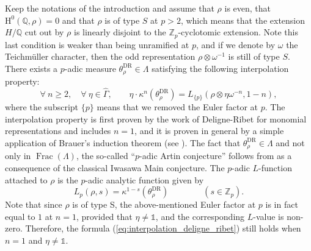 \documentclass[12pt]{amsart}
\newcommand\bQ{\mathbb{Q}}
\newcommand\Zp{{\mathbb{Z}_p}}
\DeclareMathOperator{\Frac}{Frac}
\newcommand{\HH}{\mathrm{H}}
\newcommand{\DR}{\mathrm{DR}}
\theoremstyle{defstyle}
\theoremstyle{thmstyle}
\begin{document}
Keep the notations of the introduction and assume that $\rho$ is even, that $\HH^0(\bQ,\rho)=0$ and that $\rho$ is of type $S$ at $p> 2$, which means that the extension $H/\bQ$ cut out by $\rho$ is linearly disjoint to the $\Zp$-cyclotomic extension. Note this last condition is weaker than being unramified at $p$, and if we denote by $\omega$ the Teichmüller character, then the odd representation $\rho\otimes\omega^{-1}$ is still of type $S$. There exists a $p$-adic measure $\theta_\rho^\DR\in\Lambda$ satisfying the following interpolation property:
\begin{equation}\label{eq:interpolation_deligne_ribet}
\forall\ n\geq2,\quad\forall\ \eta\in\widehat{\Gamma}, \qquad \eta\cdot\kappa^n(\theta^\DR_\rho) = L_{\{p\}}(\rho\otimes\eta\omega^{-n},1-n),
\end{equation}
where the subscript $\{p\}$ means that we removed the Euler factor at $p$. The interpolation property is first proven by the work of Deligne-Ribet \cite{deligneribet} for monomial representations and includes $n=1$, and it is proven in general by a simple application of Brauer's induction theorem (see \cite{greenbergartinII}). The fact that $\theta^\DR_\rho\in\Lambda$ and not only in $\Frac(\Lambda)$, the so-called ``$p$-adic Artin conjecture'' follows from \cite[Thm. 1.1]{wiles1990iwasawa} as a consequence of the classical Iwasawa Main conjecture. The $p$-adic $L$-function attached to $\rho$ is the $p$-adic analytic function given by $$L_p(\rho,s)=\kappa^{1-s}(\theta^\DR_\rho) \qquad\qquad (s\in\Zp).$$ 
Note that since $\rho$ is of type S, the above-mentioned Euler factor at $p$ is in fact equal to $1$ at $n=1$, provided that $\eta\neq \mathds{1}$, and the corresponding $L$-value is non-zero. Therefore, the formula (\ref{eq:interpolation_deligne_ribet}) still holds when $n=1$ and $\eta\neq \mathds{1}$.
\end{document}
